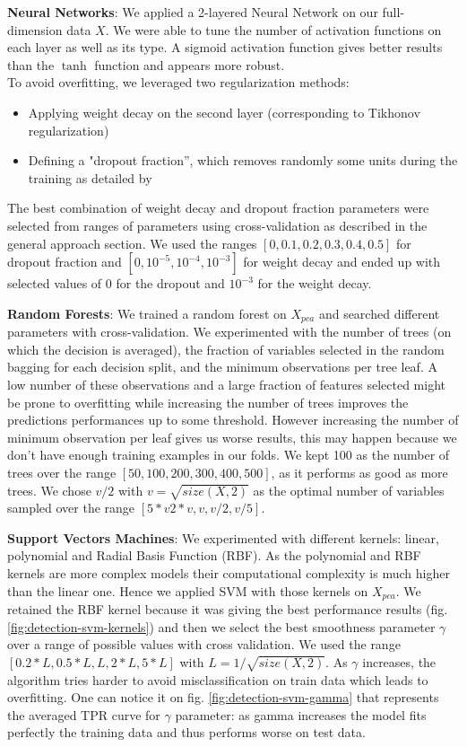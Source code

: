 \documentclass[10pt,a4paper]{article}
\begin{document}
    \textbf{Neural Networks}: We applied a 2-layered Neural Network on our full-dimension data $X$. We were able to tune the number of activation functions on each layer as well as its type. A sigmoid activation function gives better results than the $\tanh$ function and appears more robust.\\
  To avoid overfitting, we leveraged two regularization methods:
  \begin{itemize}
   	\item Applying weight decay on the second layer (corresponding to Tikhonov regularization)
	  \item Defining a "dropout fraction'', which removes randomly some units during the training as detailed by \cite{dropout}
  \end{itemize}
	The best combination of weight decay and dropout fraction parameters were selected from ranges of parameters using cross-validation as described in the general approach section. We used  the ranges $[0, 0.1, 0.2, 0.3, 0.4, 0.5]$ for dropout fraction and $[0, 10^{-5}, 10^{-4}, 10^{-3}]$ for weight decay and ended up with selected values of $0$ for the dropout and $10^{-3}$ for the weight decay.

    \textbf{Random Forests}: We trained a random forest on $X_{pca}$ and searched different parameters with cross-validation. We experimented with the number of trees (on which the decision is averaged), the fraction of variables selected in the random bagging for each decision split, and the minimum observations per tree leaf. A low number of these observations and a large fraction of features selected might be prone to overfitting while increasing the number of trees improves the predictions performances up to some threshold. However increasing the number of minimum observation per leaf gives us worse results, this may happen because we don't have enough training examples in our folds. We kept 100 as the number of trees over the range $[50, 100, 200, 300, 400, 500]$, as it performs as good as more trees. We chose $v/ 2$ with $v = \sqrt{size(X,2)}$ as the optimal number of variables sampled over the range $[5*v 2*v, v, v/ 2, v/ 5]$.

  \textbf{Support Vectors Machines}: We experimented with different kernels: linear, polynomial and Radial Basis Function (RBF). As the polynomial and RBF kernels are more complex models their computational complexity is much higher than the linear one. Hence we applied SVM with those kernels on $X_{pca}$. We retained the RBF kernel because it was giving the best performance results (fig. \ref{fig:detection-svm-kernels}) and then we select the best smoothness parameter $\gamma$ over a range of possible values with cross validation. We used the range $[0.2*L, 0.5*L, L, 2*L, 5*L]$ with $L = 1 / \sqrt{size(X,2)}$. As $\gamma$ increases, the algorithm tries harder to avoid misclassification on train data which leads to overfitting. One can notice it on fig. \ref{fig:detection-svm-gamma} that represents the averaged TPR curve for $\gamma$ parameter: as gamma increases the model fits perfectly the training data and thus performs worse on test data.
\end{document}
